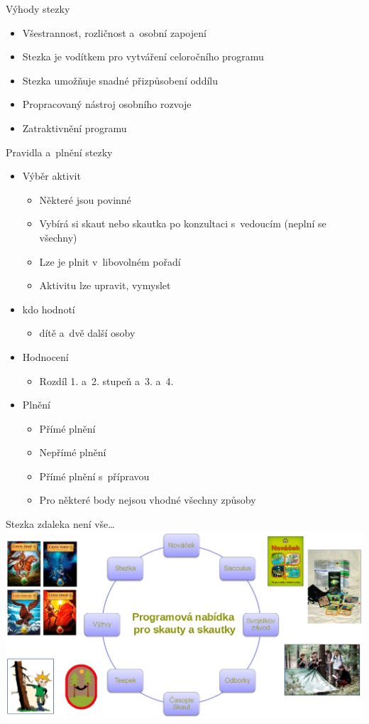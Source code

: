 \documentclass[compress,xelatex,xcolor=dvipsnames,print]{beamer}
\begin{document}
\begin{frame}{Výhody stezky}
\begin{itemize}
\item Všestrannost, rozličnost a~osobní zapojení
\item Stezka je vodítkem pro vytváření celoročního programu
\item Stezka umožňuje snadné přizpůsobení oddílu
\item Propracovaný nástroj osobního rozvoje
\item Zatraktivnění programu
\end{itemize}
\end{frame}

\begin{frame}{Pravidla a~plnění stezky}
\begin{itemize}
\item Výběr aktivit
 \begin{itemize}
 \item Některé jsou povinné
 \item Vybírá si skaut nebo skautka po konzultaci s~vedoucím (neplní se všechny)
 \item Lze je plnit v~libovolném pořadí
 \item Aktivitu lze upravit, vymyslet
 \end{itemize}
\item kdo hodnotí
 \begin{itemize}
 \item dítě a~dvě další osoby
 \end{itemize}
\item Hodnocení
 \begin{itemize}
 \item Rozdíl 1. a~2. stupeň a~3. a~4.
 \end{itemize}
\item Plnění
 \begin{itemize}
 \item Přímé plnění
 \item Nepřímé plnění
 \item Přímé plnění s~přípravou
 \item Pro některé body nejsou vhodné všechny způsoby
 \end{itemize}
\end{itemize}
\end{frame}

\begin{frame}{Stezka zdaleka není vše\ldots}
\includegraphics[width=\textwidth]{komplet.png}
\end{frame}
\end{document}
